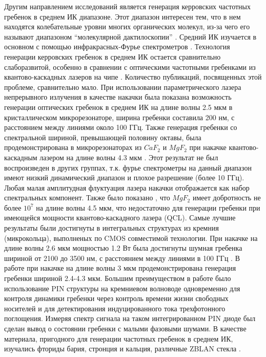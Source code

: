 Другим направлением исследований является генерация керровских частотных гребенок в среднем ИК диапазоне. Этот диапазон интересен тем, что в нем находятся колебательные уровни многих органических молекул, из-за чего его называют диапазоном “молекулярной дактилоскопии” \cite{Diddams2007,Schliesser2012}. Средний ИК изучается в основном с помощью инфракрасных-Фурье спектрометров \cite{Griffiths2006}. Технология генерации керровских гребенок в среднем ИК остается сравнительно слаборазвитой, особенно в сравнении с оптическими частотными гребенками из квантово-каскадных лазеров на чипе \cite{Hugi2012}. Количество публикаций, посвященных этой проблеме, сравнительно мало. При использовании параметрического лазера непрерывного излучения в качестве накачки была показана возможность генерации оптических гребенок в среднем ИК на длине волны 2.5 мкм в кристаллическом микрорезонаторе\cite{Wang2013}, ширина гребенки составила 200 нм, с расстоянием между линиями около 100 ГГц. Также генерация гребенки со спектральной шириной, превышающей половину октавы, была продемонстрирована в микрорезонаторах из $CaF_2$ и $MgF_2$ при накачке квантово-каскадным лазером на длине волны 4.3 мкм \cite{Savchenkov2015}. Этот результат не был воспроизведен в других группах, т.к. фурье спектрометры на данный диапазон имеют низкий динамический диапазон и плохое разрешение (более 10 ГГц). Любая малая амплитудная флуктуация лазера накачки отображается как набор спектральных компонент. Также было показано \cite{Lecaplain2016}, что $MgF_2$ имеет добротность не более $10^7$ на длине волны 4.5 мкм, что недостаточно для генерации гребенки при имеющейся мощности квантово-каскадного лазера (QCL). Самые лучшие результаты были достигнуты в интегральных структурах из кремния (микрокольца), выполненых по CMOS совместимой технологии. При накачке на длине волны 2.6 мкм мощностью 1.2 Вт была достигнуты шумная гребенка шириной от 2100 до 3500 нм, с расстоянием между линиями в 100 ГГц \cite{Griffith2015}. В работе \cite{Griffith2016} при накачке на длине волны 3 мкм продемонстрирована генерация гребенки шириной 2.4-4.3 мкм. Большим преимуществом в работе было использование PIN структуры на кремниевом волноводе одновременно для контроля динамики гребенки через контроль времени жизни свободных носителей и для детектирования индуцированного тока трехфотонного поглощения. Измеряя спектр сигнала на таком интегрированном PIN диоде был сделан вывод о состоянии гребенки с малыми фазовыми шумами. В качестве материала, пригодного для генерации частотных гребенок в среднем ИК, изучались фториды бария, стронция и кальция, различные ZBLAN стекла \cite{Grudinin2016,Way2012,Lecaplain2016}.

